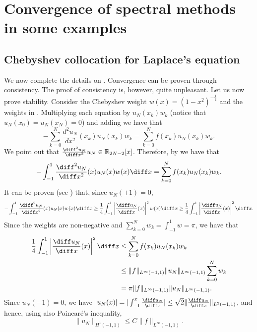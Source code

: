 \chapter{Convergence of spectral methods in some examples}
\section{Chebyshev collocation for Laplace's equation}
We now complete the details on . Convergence can be proven through consistency.
The proof of consistency is, however, quite unpleasant.
Let us now prove stability.
Consider the Chebyshev weight $w(x) = (1-x^2)^{-\frac 1 2}$ and the weights in .
Multiplying each equation by $u_N (x_k) w_k$ (notice that $u_N(x_0) = u_N(x_N) = 0$) and adding we have that
\begin{equation*}
    -\sum_{k=0}^N \frac{d^2 u_N}{dx^2} (x_k) u_N (x_k) w_k = \sum_{k=0}^N f(x_k) u_N(x_k) w_k.
\end{equation*}
We point out that $\frac{\diff^2u_N}{\diff x^2} u_N \in \mathbb R_{2N - 2}[x]$. Therefore, by  we have that
\begin{equation*}
    -\int_{-1}^1 \frac{\diff^2u_N}{\diff x^2} (x) u_N(x) w(x) \diff x = \sum_{k=0}^N f(x_k) u_N(x_k) w_k.
\end{equation*}
It can be proven (see \cite[Section 7.1]{CanutoHussainiQuarteroniZang2011}) that, since $u_N(\pm 1) = 0$,
\begin{equation*}
    -\int_{-1}^1 \frac{\diff^2u_N}{\diff x^2} (x) u_N(x) w(x) \diff x \ge \frac 1 4 \int_{-1}^1 \left| \frac{\diff u_N}{\diff x} (x) \right|^2 w(x) \diff x \ge \frac 1 4 \int_{-1}^1 \left| \frac{\diff u_N}{\diff x} (x) \right|^2 \diff x.
\end{equation*}
Since the weights are non-negative and $\sum_{k=0}^N w_k = \int_{-1}^1 w = \pi$, we have that
\begin{align*}
    \frac 1 4 \int_{-1}^1 \left| \frac{\diff u_N}{\diff x} (x) \right|^2 \diff x
     & \le \sum_{k=0}^N f(x_k) u_N(x_k) w_k                        \\
     & \le \| f \|_{L^\infty(-1,1)} \| u_N \|_{L^\infty(-1,1)} \sum_{k=0}^N w_k   \\
     & = \pi \| f \|_{L^\infty(-1,1)} \| u_N \|_{L^\infty(-1,1)}.
\end{align*}
Since $u_N(-1) = 0$, we have $|u_N(x)| = |\int_{-1}^x \frac{\diff u_N}{\diff x}| \le \sqrt 2 \|\frac{\diff u_N}{\diff x}\|_{L^2(-1,1)}$, and hence, using also Poincaré's inequality,
\begin{equation*}
    \| u_N \|_{H^1(-1,1)} \le C \| f \|_{L^\infty(-1,1)}.
\end{equation*}

